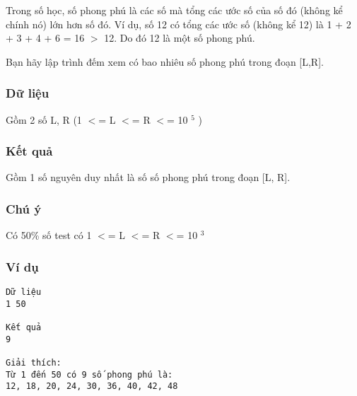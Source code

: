 



   Trong số học, số phong phú là các số mà tổng các ước số của số đó (không kể chính nó) lớn hơn số đó. Ví dụ, số 12 có tổng các ước số (không kể 12) là 1 + 2 + 3 + 4 + 6 = 16 $>$ 12. Do đó 12 là một số phong phú.  

   Bạn hãy lập trình đếm xem có bao nhiêu số phong phú trong đoạn [L,R].  

\subsubsection{   Dữ liệu  }

   Gồm 2 số L, R (1 $<$= L $<$= R $<$= 10   $^    5   $   )  

\subsubsection{   Kết quả  }

   Gồm 1 số nguyên duy nhất là số số phong phú trong đoạn [L, R].  

\subsubsection{   Chú ý  }

   Có 50\% số test có 1 $<$= L $<$= R $<$= 10   $^    3   $

\subsubsection{   Ví dụ  }
\begin{verbatim}
Dữ liệu
1 50

Kết quả
9

Giải thích:
Từ 1 đến 50 có 9 số phong phú là: 
12, 18, 20, 24, 30, 36, 40, 42, 48
\end{verbatim}